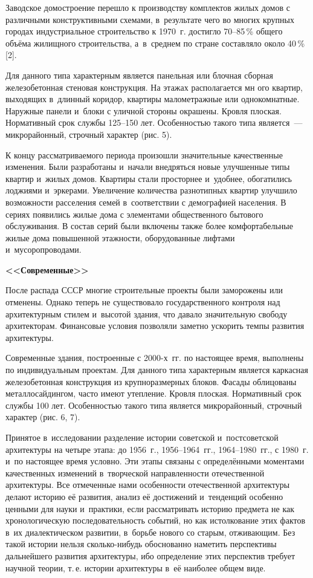 Заводское домостроение перешло к производству комплектов жилых домов с различными конструктивными схемами, в~результате чего во многих крупных городах индустриальное строительство к 1970~г. достигло 70--85\,\% общего объёма жилищного строительства, а~в~среднем по стране составляло около 40\,\% [2].

Для данного типа характерным является панельная или блочная сборная железобетонная стеновая конструкция. На этажах располагается мн ого квартир, выходящих в~длинный коридор, квартиры малометражные или однокомнатные. Наружные панели и~блоки с уличной стороны окрашены. Кровля плоская. Нормативный срок службы 125--150 лет. Особенностью такого типа является~--- микрорайонный, строчный характер (рис. 5).



К концу рассматриваемого периода произошли значительные качественные изменения. Были разработаны и~начали внедряться новые улучшенные типы квартир и~жилых домов. Квартиры стали просторнее и~удобнее, обогатились лоджиями и~эркерами. Увеличение количества разнотипных квартир улучшило возможности расселения семей в~соответствии с демографией населения. В сериях появились жилые дома с элементами общественного бытового обслуживания. В состав серий были включены также более комфортабельные жилые дома повышенной этажности, оборудованные лифтами и~мусоропроводами.

\textbf{<<Современные>>}

После распада СССР многие строительные проекты были заморожены или отменены. Однако теперь не существовало государственного контроля над архитектурным стилем и~высотой здания, что давало значительную свободу архитекторам. Финансовые условия позволяли заметно ускорить темпы развития архитектуры.

Современные здания, построенные с 2000-х~гг. по настоящее время, выполнены по индивидуальным проектам. Для данного типа характерным является каркасная железобетонная конструкция из крупноразмерных блоков. Фасады облицованы металлосайдингом, часто имеют утепление. Кровля плоская. Нормативный срок службы 100 лет. Особенностью такого типа является микрорайонный, строчный характер (рис. 6, 7).


\vspace{-12pt}
Принятое в~исследовании разделение истории советской и~постсоветской архитектуры на четыре этапа: до 1956~г., 1956--1964~гг., 1964--1980~гг., с 1980~г. и~по настоящее время условно. Эти этапы связаны с определёнными моментами качественных изменений в~творческой направленности отечественной архитектуры. Все отмеченные нами особенности отечественной архитектуры делают историю её развития, анализ её достижений и~тенденций особенно ценными для науки и~практики, если рассматривать историю предмета не как хронологическую последовательность событий, но как истолкование этих фактов в~их диалектическом развитии, в~борьбе нового со старым, отживающим. Без такой истории нельзя сколько-нибудь обоснованно наметить перспективы дальнейшего развития архитектуры, ибо определение этих перспектив требует научной теории, т.\,е. истории архитектуры в~её наиболее общем виде.

